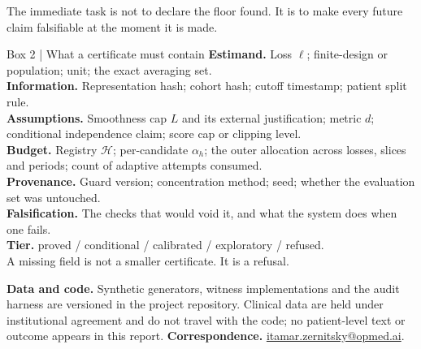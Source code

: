 \documentclass[11pt,a4paper]{article}
\newcommand{\tier}[1]{\textsf{\small#1}}
\begin{document}
The immediate task is not to declare the floor found. It is to make every future claim falsifiable at the moment it is made.

\vspace{1.2em}
\begin{keybox}{Box 2 \;|\; What a certificate must contain}
\small
\textbf{Estimand.} Loss $\ell$; finite-design or population; unit; the exact averaging set.\\
\textbf{Information.} Representation hash; cohort hash; cutoff timestamp; patient split rule.\\
\textbf{Assumptions.} Smoothness cap $L$ and its external justification; metric $d$; conditional independence claim; score cap or clipping level.\\
\textbf{Budget.} Registry $\mathcal H$; per-candidate $\alpha_h$; the outer allocation across losses, slices and periods; count of adaptive attempts consumed.\\
\textbf{Provenance.} Guard version; concentration method; seed; whether the evaluation set was untouched.\\
\textbf{Falsification.} The checks that would void it, and what the system does when one fails.\\
\textbf{Tier.} \tier{proved} / \tier{conditional} / \tier{calibrated} / \tier{exploratory} / \tier{refused}.\\[0.3em]
A missing field is not a smaller certificate. It is a refusal.
\end{keybox}

\vspace{0.8em}
{\footnotesize\textbf{Data and code.} Synthetic generators, witness implementations and the audit harness are versioned in the project repository. Clinical data are held under institutional agreement and do not travel with the code; no patient-level text or outcome appears in this report. \quad\textbf{Correspondence.} \href{mailto:itamar.zernitsky@opmed.ai}{itamar.zernitsky@opmed.ai}.}
\end{document}
